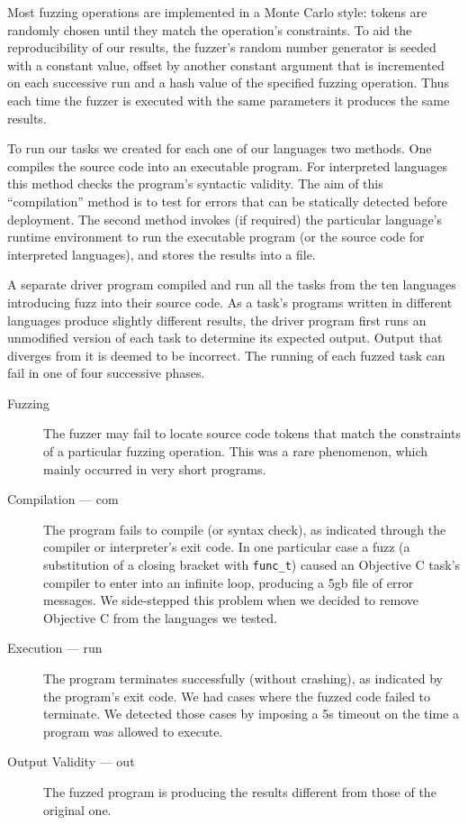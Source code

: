 \documentclass[10pt]{sigplanconf}
\begin{document}
Most fuzzing operations are implemented in a Monte Carlo style:
tokens are randomly chosen until they match the operation's constraints.
To aid the reproducibility of our results,
the fuzzer's random number generator is seeded with a constant value,
offset by another constant argument that is incremented on each successive run
and a hash value of the specified fuzzing operation.
Thus each time the fuzzer is executed with the same parameters it
produces the same results.

To run our tasks we created for each one of our languages two methods.
One compiles the source code into an executable program.
For interpreted languages this method checks the program's syntactic validity.
The aim of this ``compilation'' method is to test for errors that can
be statically detected before deployment.
The second method invokes (if required) the particular language's
runtime environment to run the executable program
(or the source code for interpreted languages),
and stores the results into a file.

A separate driver program compiled and run all the tasks from the ten
languages introducing fuzz into their source code.
As a task's programs written in different languages produce slightly
different results,
the driver program first runs an unmodified version of each task
to determine its expected output.
Output that diverges from it is deemed to be incorrect.
The running of each fuzzed task can fail in one of four successive
phases.
\begin{description}
\item[Fuzzing]
The fuzzer may fail to locate source code tokens that match the
constraints of a particular fuzzing operation.
This was a rare phenomenon, which mainly occurred in very short programs.
\item[Compilation --- com]
The program fails to compile (or syntax check),
as indicated through the compiler or interpreter's exit code.
In one particular case a fuzz
(a substitution of a closing bracket with {\tt func\_t})
caused an Objective C task's compiler
to enter into an infinite loop,
producing a 5{\sc gb} file of error messages.
We side-stepped this problem when we decided to remove Objective C from
the languages we tested.
\item[Execution --- run]
The program terminates successfully (without crashing),
as indicated by the program's exit code.
We had cases where the fuzzed code failed to terminate.
We detected those cases by imposing a 5s timeout on the time a program
was allowed to execute.
\item[Output Validity --- out]
The fuzzed program is producing the results different from those of
the original one.
\end{description}
\end{document}
